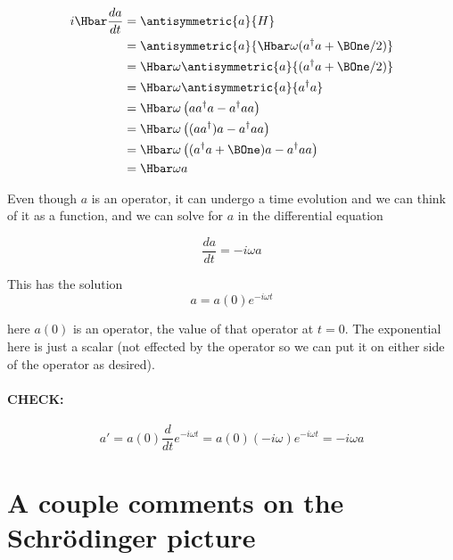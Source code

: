 \begin{equation}\label{eqn:lecture11harmonicOscillator:780}
\begin{aligned}
i \Hbar \frac{d a}{dt}
&= \antisymmetric{ a }{H} \\
&= \antisymmetric{ a }{ \Hbar \omega (a^\dagger a + \BOne/2) } \\
&= \Hbar\omega \antisymmetric{ a }{ (a^\dagger a + \BOne/2) } \\
&= \Hbar\omega \antisymmetric{ a }{ a^\dagger a } \\
&= \Hbar\omega \left( a a^\dagger a - a^\dagger a a \right) \\
&= \Hbar\omega \left( (a a^\dagger) a - a^\dagger a a \right) \\
&= \Hbar\omega \left( (a^\dagger a + \BOne) a - a^\dagger a a \right) \\
&= \Hbar\omega a
\end{aligned}
\end{equation}

Even though \(a\) is an operator, it can undergo a time evolution and we can think of it as a function, and we can solve for \(a\) in the differential equation

\begin{equation}\label{eqn:PHY356FLecture11:280}
\frac{d a}{dt} = -i \omega a
\end{equation}

This has the solution
\begin{equation}\label{eqn:PHY356FLecture11:290}
a = a(0) e^{-i \omega t}
\end{equation}

here \(a(0)\) is an operator, the value of that operator at \(t = 0\).  The exponential here is just a scalar (not effected by the operator so we can put it on either side of the operator as desired).

\paragraph{CHECK:}
\begin{equation}\label{eqn:PHY356FLecture11:291}
a' = a(0) \frac{d}{dt} e^{-i \omega t} = a(0) (-i \omega) e^{-i \omega t} = -i \omega a
\end{equation}

\section{A couple comments on the Schr\"{o}dinger picture}

